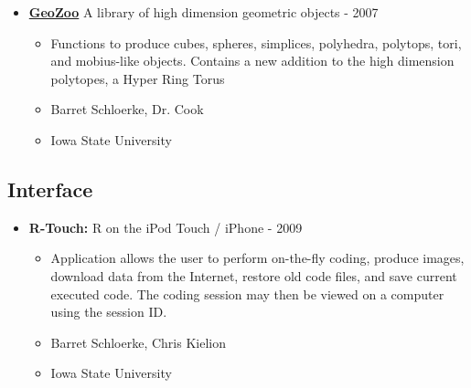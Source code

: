 \documentclass[oneside]{article}
\begin{document}
\begin{itemize}
      
      \item{\bf \href{http://streaming.stat.iastate.edu/~dicook/geometric-data/}{GeoZoo}} A library of high dimension geometric objects - 2007
        \begin{itemize}
          \item Functions to produce cubes, spheres, simplices, polyhedra, polytops, tori, and mobius-like objects. Contains a new addition to the high dimension polytopes, a Hyper Ring Torus
          \item Barret Schloerke, Dr. Cook
          \item Iowa State University
        \end{itemize}
          
      
    \end{itemize}
    
  \subsection{Interface}
    \begin{itemize}
      \item{\bf R-Touch:}  R on the iPod Touch / iPhone - 2009
      \begin{itemize}
        \item Application allows the user to perform on-the-fly coding, produce images, download data from the Internet, restore old code files, and save current executed code.  The coding session may then be viewed on a computer using the session ID.
        \item Barret Schloerke, Chris Kielion
        \item Iowa State University
      \end{itemize}
      
    
    \end{itemize}
\end{document}
